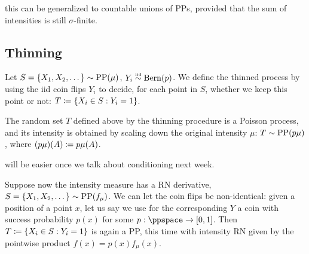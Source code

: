 \documentclass{article}
\begin{document}
 this can be generalized to countable unions of PPs, provided that the sum of intensities is still $\sigma$-finite. 


\subsection{Thinning}

 Let $S = \{X_1, X_2, \dots\} \sim \operatorname{PP}(\mu)$, $Y_i \stackrel{\scriptscriptstyle \textrm{iid}}{\sim} \operatorname{Bern}(p)$. We define the thinned process by using the iid coin flips $Y_i$ to decide, for each point in $S$, whether we keep this point or not: $T \coloneqq \{X_i \in S : Y_i = 1\}$.

 The random set $T$ defined above by the thinning procedure is a Poisson process, and its intensity is obtained by scaling down the original intensity $\mu$: $T \sim \operatorname{PP}(p\mu)$, where $(p\mu)(A) \coloneqq p \mu(A)$.

 will be easier once we talk about conditioning next week. 

 Suppose now the intensity measure has a RN derivative, $S = \{X_1, X_2, \dots\} \sim \operatorname{PP}(f_\mu)$. We can let the coin flips be non-identical: given a position of a point $x$, let us say we use for the corresponding $Y$ a coin with success probability $p(x)$ for some $p : \ppspace \to [0, 1]$. Then $T \coloneqq \{X_i \in S : Y_i = 1\}$ is again a PP, this time with intensity RN given by the pointwise product $f(x) = p(x) f_\mu(x)$.
\end{document}
